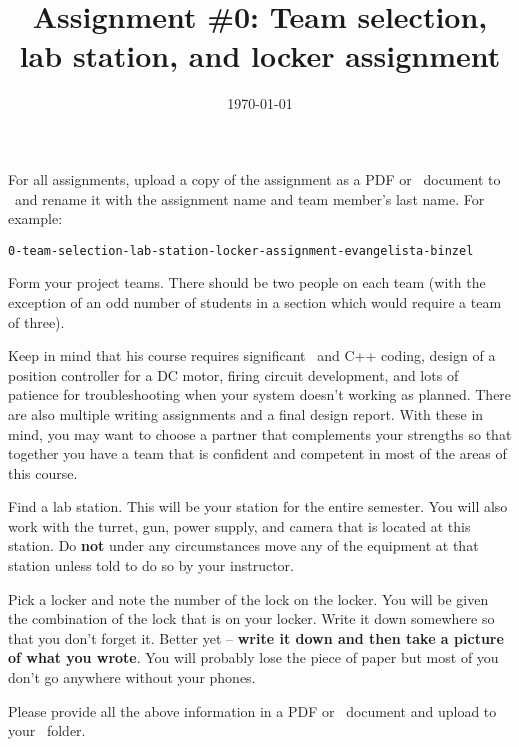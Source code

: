 \documentclass[noanswers]{exam}
\title{Assignment \#0: Team selection, lab station, and locker assignment}
\author{\usnaAuthorShort}
\date{\today}
\begin{document}
\maketitle

For all assignments, upload a copy of the assignment as a PDF or \Google\ document to \GoogleClassroom\ and rename it with the assignment name and team member’s last name.  For example:
\begin{lstlisting}
0-team-selection-lab-station-locker-assignment-evangelista-binzel
\end{lstlisting}

\begin{questions}
\question Form your project teams.  There should be two people on each team (with the exception of an odd number of students in a section which would require a team of three).  

Keep in mind that his course requires significant \Matlab\ and C++ coding, design of a position controller for a DC motor, firing circuit development, and lots of patience for troubleshooting when your system doesn’t working as planned.  There are also multiple writing assignments and a final design report. With these in mind, you may want to choose a partner that complements your strengths so that together you have a team that is confident and competent in most of the areas of this course.
\begin{solution}[2in]
\end{solution}

\question Find a lab station.  This will be your station for the entire semester.  You will also work with the turret, gun, power supply, and camera that is located at this station.  Do \textbf{not} under any circumstances move any of the equipment at that station unless told to do so by your instructor.  
\begin{solution}[1in]
\end{solution}

\question
Pick a locker and note the number of the lock on the locker.  You will be given the combination of the lock that is on your locker.  Write it down somewhere so that you don’t forget it.  Better yet -- \textbf{write it down and then take a picture of what you wrote}.  You will probably lose the piece of paper but most of you don’t go anywhere without your phones.  
\begin{solution}[1in]
\end{solution}

\question
Please provide all the above information in a PDF or \Google\ document and upload to your \GoogleClassroom\ folder.    
\end{questions}
\end{document}
